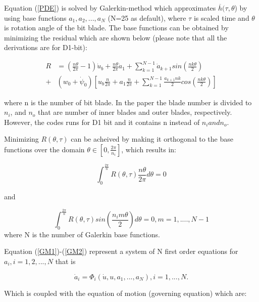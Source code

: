 Equation (\ref{PDE}) is solved by Galerkin-method which approximates $\overline{h}(\tau, \theta$) by using base functions $a_1, a_2, ..., a_N$ (N=25 as default), where $\tau$ is scaled time and $\theta$ is rotation angle of the bit blade. The base functions can be obtained by minimizing the residual which are shown below (please note that all the derivations are for D1-bit):

\begin{equation}\label{GM}
\begin{split}
R &= \left(\frac{n \theta}{2 \pi}-1\right)\dot{u}_b + \frac{n \theta}{2 \pi}\dot{a}_1 + \sum_{k=1}^{N-1}\dot{a}_{k+1}sin\left(\frac{nk\theta}{2}\right) \\ + &(w_0 + \dot{\psi}_0)\left[u_b\frac{n}{2\pi}+a_1\frac{n}{2\pi} + \sum_{k=1}^{N-1}\frac{a_{k+1}nk}{2}cos\left(\frac{nk\theta}{2}\right)\right]
\end{split}
\end{equation}

where n is the number of bit blade. In the paper the blade number is divided to $n_i$, and $n_o$ that are number of inner blades and outer blades, respectively. However, the codes runs for D1 bit and it contains n instead of $n_i and n_o$.

Minimizing $R(\theta, \tau)$ can be acheived by making it orthogonal to the base functions over the domain $\theta \in \left[0, \frac{2\pi}{n_i}\right]$, which results in:

\begin{equation}\label{GM1}
 \int_{0}^{\frac{2\pi}{n}}R(\theta,\tau)\frac{n\theta}{2\pi}d\theta = 0
\end{equation}

and

\begin{equation}\label{GM2}
 \int_{0}^{\frac{2\pi}{n}}R(\theta, \tau)sin\left(\frac{n_im\theta}{2}\right)d\theta=0, m= 1,....,N-1
\end{equation}
where N is the number of Galerkin base functions.

Equation (\ref{GM1})-(\ref{GM2}) represent a system of N first order equations for $a_i, i=1,2,...,N$ that is

\begin{equation}\label{Norder}
  \dot{a}_i = \Phi_i(\dot{u}, u, a_1, ..., a_N), i=1,...,N.
\end{equation}

Which is coupled with the equation of motion (governing equation) which are:


